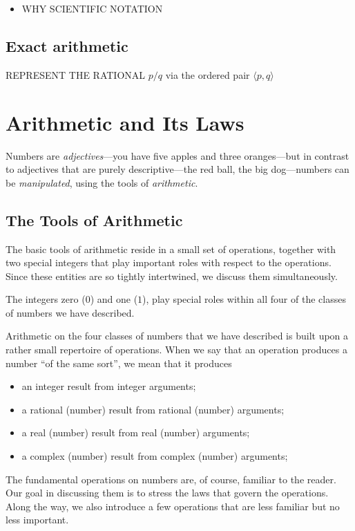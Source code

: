 \begin{itemize}
\item
WHY SCIENTIFIC NOTATION
\end{itemize}

\subsection{Exact arithmetic}

REPRESENT THE RATIONAL $p/q$ via the ordered pair $\langle p,q \rangle$






\section{Arithmetic and Its Laws}
\label{sec:Arithmetic-Tools+Laws}

Numbers are {\it adjectives}---you have
five apples and three oranges---but in contrast to adjectives that are
purely descriptive---the red ball, the big dog---numbers can be {\em
  manipulated}, using the
tools of {\it arithmetic}.

\subsection{The Tools of Arithmetic}
\label{sec:arithmetic-tools}

The basic tools of arithmetic reside in a small set of operations,
together with two special integers that play important roles with
respect to the operations.  Since these entities are so tightly
intertwined, we discuss them simultaneously.

\smallskip

%
The integers zero ($0$) and one
($1$), play special roles within all four of
the classes of numbers we have described.

\smallskip

%
Arithmetic on the four classes of numbers that we have described is
built upon a rather small repertoire of operations.  When we say that
an operation produces a number ``of the same sort'', we mean that it
produces
\begin{itemize}
\item
an integer result from integer arguments;
\item
a rational (number) result from rational (number) arguments;
\item
a real (number) result from real (number) arguments;
\item
a complex (number) result from complex (number) arguments;
\end{itemize}
The fundamental operations on numbers are, of course, familiar to the
reader.  Our goal in discussing them is to stress the laws that govern
the operations.  Along the way, we also introduce a few operations
that are less familiar but no less important.

